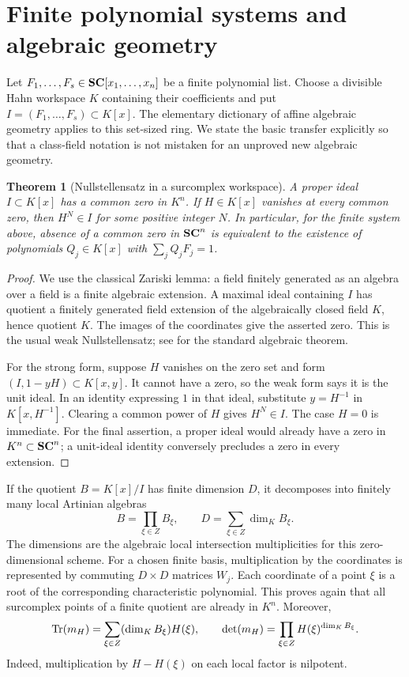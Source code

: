 \documentclass[11pt,letterpaper,oneside]{article}
\numberwithin{equation}{section}
\newtheorem{theorem}{Theorem}[section]
\theoremstyle{definition}
\theoremstyle{remark}\newtheorem{remark}[theorem]{Remark}
\begin{document}
\section{Finite polynomial systems and algebraic geometry}\label{sec:systems}
Let $F_1,\ldots,F_s\in\mathbf{SC}[x_1,\ldots,x_n]$ be a finite polynomial list.
Choose a divisible Hahn workspace $K$ containing their coefficients and
put $I=(F_1,\ldots,F_s)\subset K[x]$. The elementary dictionary of
affine algebraic geometry applies to this set-sized ring. We state the
basic transfer explicitly so that a class-field notation is not mistaken
for an unproved new algebraic geometry.

\begin{theorem}[Nullstellensatz in a surcomplex workspace]\label{thm:nullstellensatz}
A proper ideal $I\subset K[x]$ has a common zero in $K^n$. If
$H\in K[x]$ vanishes at every common zero, then $H^N\in I$ for some
positive integer $N$. In particular, for the finite system above,
absence of a common zero in $\mathbf{SC}^n$ is equivalent to the existence of
polynomials $Q_j\in K[x]$ with $\sum_jQ_jF_j=1$.
\end{theorem}
\begin{proof}
We use the classical Zariski lemma: a field finitely generated as an
algebra over a field is a finite algebraic extension. A maximal ideal
containing $I$ has quotient a finitely generated field extension of the
algebraically closed field $K$, hence quotient $K$. The images of the
coordinates give the asserted zero. This is the usual weak
Nullstellensatz; see \cite{StacksNull} for the standard algebraic theorem.

For the strong form, suppose $H$ vanishes on the zero set and form
$(I,1-yH)\subset K[x,y]$. It cannot have a zero, so the weak form says
it is the unit ideal. In an identity expressing $1$ in that ideal,
substitute $y=H^{-1}$ in $K[x,H^{-1}]$. Clearing a common power of $H$
gives $H^N\in I$. The case $H=0$ is immediate. For the final assertion,
a proper ideal would already have a zero in $K^n\subset\mathbf{SC}^n$;
a unit-ideal identity conversely precludes a zero in every extension.
\end{proof}

If the quotient $B=K[x]/I$ has finite dimension $D$, it decomposes into
finitely many local Artinian algebras
\begin{equation}\label{eq:finitealgebraproduct}
 B=\prod_{\xi\in Z}B_\xi,\qquad
 D=\sum_{\xi\in Z}\dim_K B_\xi.
\end{equation}
The dimensions are the algebraic local intersection multiplicities for
this zero-dimensional scheme. For a chosen finite basis, multiplication
by the coordinates is represented by commuting $D\times D$ matrices
$W_j$. Each coordinate of a point $\xi$ is a root of the corresponding
characteristic polynomial. This proves again that all surcomplex points
of a finite quotient are already in $K^n$. Moreover,
\begin{equation}\label{eq:multivartrace}
 \operatorname{Tr}(m_H)=\sum_{\xi\in Z}(\dim_KB_\xi)H(\xi),\qquad
 \det(m_H)=\prod_{\xi\in Z}H(\xi)^{\dim_KB_\xi}.
\end{equation}
Indeed, multiplication by $H-H(\xi)$ on each local factor is nilpotent.
\end{document}
